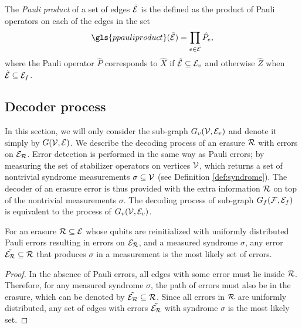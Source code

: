 \begin{definition}\label{def:pauliprod}
  The \emph{Pauli product} of a set of edges $\tilde{\mathcal{E}}$ is the defined as the product of Pauli operators on each of the edges in the set
  \begin{equation}\label{eq:pauliprod}
    \gls{ppauliproduct}(\tilde{\m{E}}) = \prod_{e\in \tilde{\m{E}}} \hat{P}_e,
  \end{equation}
  where the Pauli operator $\hat{P}$ corresponds to $\hat{X}$ if $\tilde{\mathcal{E}}\subseteq \mathcal{E}_v$ and otherwise $\hat{Z}$ when $\tilde{\mathcal{E}}\subseteq \mathcal{E}_f$.
\end{definition}

\subsection{Decoder process}
In this section, we will only consider the sub-graph $G_v(\mathcal{V},\mathcal{E}_v)$ and denote it simply by $G(\mathcal{V},\mathcal{E})$. We describe the decoding process of an erasure $\mathcal{R}$ with errors on $\mathcal{E}_{\mathcal{R}}$. Error detection is performed in the same way as Pauli errors; by measuring the set of stabilizer operators on vertices $\mathcal{V}$, which returns a set of nontrivial syndrome measurements $\sigma \subseteq \mathcal{V}$ (see Definition \ref{def:syndrome}). The decoder of an erasure error is thus provided with the extra information $\mathcal{R}$ on top of the nontrivial measurements $\sigma$. The decoding process of sub-graph $G_f(\mathcal{F},\mathcal{E}_f)$ is equivalent to the process of $G_v(\mathcal{V},\mathcal{E}_v)$.
\begin{lemma}\label{lem:peelinguni}
  For an erasure $\mathcal{R} \subseteq \mathcal{E}$ whose qubits are reinitialized with uniformly distributed Pauli errors resulting in errors on $\mathcal{E}_{\mathcal{R}}$, and a measured syndrome $\sigma$, any error $\tilde{\mathcal{E}_{\mathcal{R}}} \subseteq \mathcal{R}$ that produces $\sigma$ in a measurement is the most likely set of errors.
\end{lemma}
\begin{proof}
  In the absence of Pauli errors, all edges with some error must lie inside $\mathcal{R}$. Therefore, for any measured syndrome $\sigma$, the path of errors must also be in the erasure, which can be denoted by $\tilde{\mathcal{E}_{\mathcal{R}}} \subseteq \mathcal{R}$. Since all errors in $\mathcal{R}$ are uniformly distributed, any set of edges with errors $\tilde{\mathcal{E}_{\mathcal{R}}}$ with syndrome $\sigma$ is the most likely set.
\end{proof}

